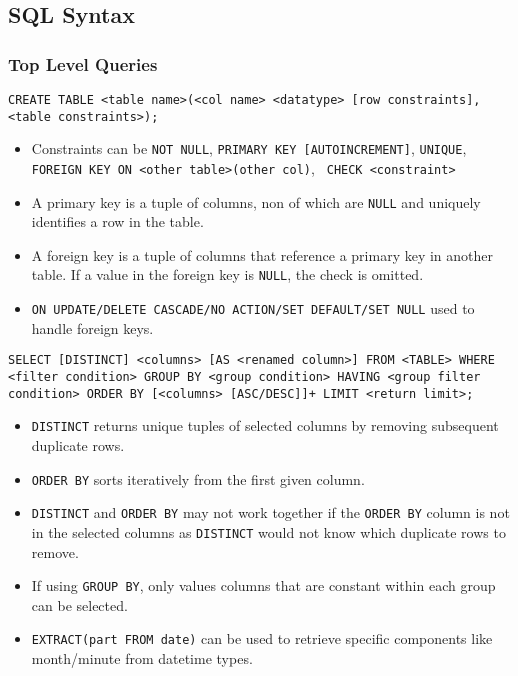 \begin{multicols*}{3}
\setlength{\premulticols}{1pt}
\setlength{\postmulticols}{1pt}
\setlength{\multicolsep}{1pt}
\setlength{\columnsep}{2pt}

\subsection{SQL Syntax}
\subsubsection{Top Level Queries}
\texttt{CREATE TABLE <table name>(<col name> <datatype> [row constraints], <table constraints>);}
\begin{itemize}[leftmargin=*]
    \item  Constraints can be \texttt{NOT NULL}, \texttt{PRIMARY KEY [AUTOINCREMENT]}, \texttt{UNIQUE}, \texttt{FOREIGN KEY ON <other table>(other col)}, \texttt{ CHECK <constraint>}
    \item  A primary key is a tuple of columns, non of which are \texttt{NULL} and uniquely identifies a row in the table.
    \item  A foreign key is a tuple of columns that reference a primary key in another table. If a value in the foreign key is \texttt{NULL}, the check is omitted.
    \item  \texttt{ON UPDATE/DELETE CASCADE/NO ACTION/SET DEFAULT/SET NULL} used to handle foreign keys.\\
\end{itemize}

\noindent\texttt{SELECT [DISTINCT] <columns> [AS <renamed column>] FROM <TABLE> WHERE <filter condition> GROUP BY <group condition> HAVING <group filter condition> ORDER BY [<columns> [ASC/DESC]]+ LIMIT <return limit>;}
\begin{itemize}[leftmargin=*]
    \item \texttt{DISTINCT} returns unique tuples of selected columns by removing subsequent duplicate rows. 
    \item \texttt{ORDER BY} sorts iteratively from the first given column. 
    \item \texttt{DISTINCT} and \texttt{ORDER BY} may not work together if the \texttt{ORDER BY} column is not in the selected columns as \texttt{DISTINCT} would not know which duplicate rows to remove.
    \item  If using \texttt{GROUP BY}, only values columns that are constant within each group can be selected.
    \item \texttt{EXTRACT(part FROM date)} can be used to retrieve specific components like month/minute from datetime types.\\
\end{itemize}


\end{multicols*}
